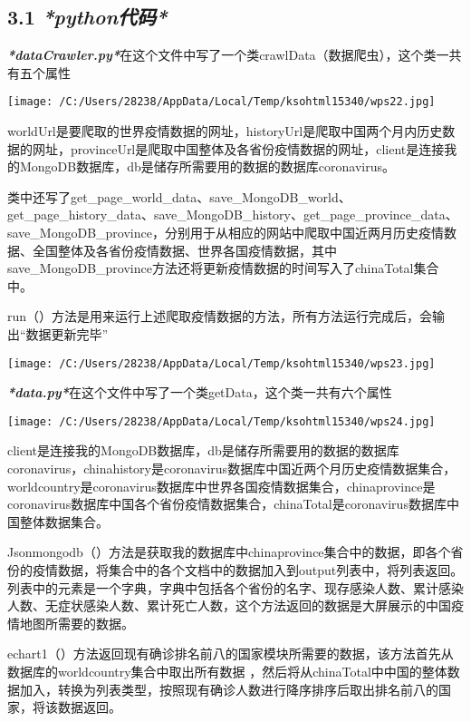 \documentclass[
]{article}
\begin{document}
\hypertarget{31-pythonux4ee3ux7801}{%
\subsection{\texorpdfstring{\textbf{3.1}
\emph{\textbf{*python代码*}}}{3.1 *python代码*}}\label{31-pythonux4ee3ux7801}}

\emph{\textbf{*dataCrawler.py*}}在这个文件中写了一个类crawlData（数据爬虫），这个类一共有五个属性

\texttt{[image: /C:/Users/28238/AppData/Local/Temp/ksohtml15340/wps22.jpg]}

worldUrl是要爬取的世界疫情数据的网址，historyUrl是爬取中国两个月内历史数据的网址，provinceUrl是爬取中国整体及各省份疫情数据的网址，client是连接我的MongoDB数据库，db是储存所需要用的数据的数据库coronavirus。

类中还写了get\_page\_world\_data、save\_MongoDB\_world、get\_page\_history\_data、save\_MongoDB\_history、get\_page\_province\_data、save\_MongoDB\_province，分别用于从相应的网站中爬取中国近两月历史疫情数据、全国整体及各省份疫情数据、世界各国疫情数据，其中save\_MongoDB\_province方法还将更新疫情数据的时间写入了chinaTotal集合中。

run（）方法是用来运行上述爬取疫情数据的方法，所有方法运行完成后，会输出``数据更新完毕''

\texttt{[image: /C:/Users/28238/AppData/Local/Temp/ksohtml15340/wps23.jpg]}

\emph{\textbf{*data.py*}}在这个文件中写了一个类getData，这个类一共有六个属性

\texttt{[image: /C:/Users/28238/AppData/Local/Temp/ksohtml15340/wps24.jpg]}

client是连接我的MongoDB数据库，db是储存所需要用的数据的数据库coronavirus，chinahistory是coronavirus数据库中国近两个月历史疫情数据集合，worldcountry是coronavirus数据库中世界各国疫情数据集合，chinaprovince是coronavirus数据库中国各个省份疫情数据集合，chinaTotal是coronavirus数据库中国整体数据集合。

Jsonmongodb（）方法是获取我的数据库中chinaprovince集合中的数据，即各个省份的疫情数据，将集合中的各个文档中的数据加入到output列表中，将列表返回。列表中的元素是一个字典，字典中包括各个省份的名字、现存感染人数、累计感染人数、无症状感染人数、累计死亡人数，这个方法返回的数据是大屏展示的中国疫情地图所需要的数据。

echart1（）方法返回现有确诊排名前八的国家模块所需要的数据，该方法首先从数据库的worldcountry集合中取出所有数据
，然后将从chinaTotal中中国的整体数据加入，转换为列表类型，按照现有确诊人数进行降序排序后取出排名前八的国家，将该数据返回。
\end{document}
